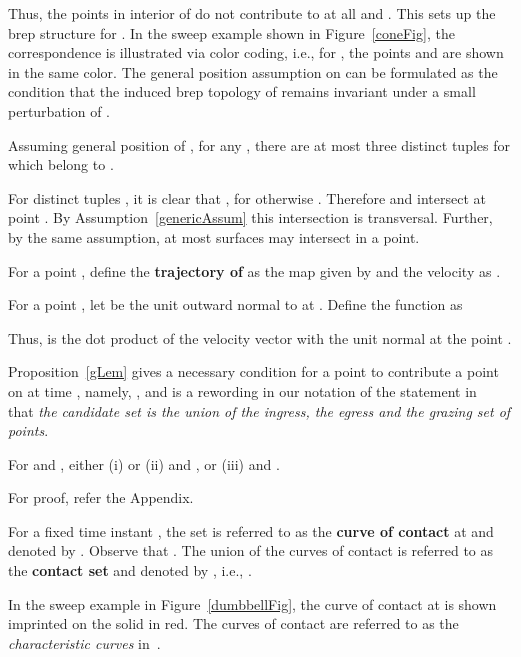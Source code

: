 \documentclass{elsart5p}
\begin{document}
Thus, the points in interior of  do not contribute to  at all and 
.  This sets up the brep 
structure for .
In the sweep example shown in Figure~\ref{coneFig}, 
the correspondence  is illustrated via color coding, i.e.,   
for , the points  and  are shown in the same color.
The general position assumption on  can be formulated as the condition
that the induced brep topology of  remains invariant under a small
perturbation of .

\begin{lem} \label{preImageLem}
Assuming general position of , for any , there are at 
most three distinct tuples  for   which belong to .
\end{lem}
 For distinct tuples , it is clear that , for otherwise .
Therefore  and  intersect 
at point .  By Assumption~\ref{genericAssum} 
this intersection is transversal.  Further, by the same assumption, at most  surfaces may intersect in a 
point. \hfill 

\begin{defn} \label{trajXDef}
For a point , define the {\bf trajectory of}  as the map  
given by  and the velocity  as 
.
\end{defn}

For a point , let  be the unit outward normal to  at .  Define the function 
 as 
 
Thus,  is the dot product of the velocity vector with the unit normal at the point .


Proposition~\ref{gLem} gives a necessary condition for a point  to 
contribute a point on  at time , namely, , 
and is a rewording in our notation of the statement in~\cite{sede} that 
{\em the candidate set is the union of the ingress, the egress and the 
grazing set of points}.

\begin{prop} \label{gLem}
For  and , either 
(i)  or 
(ii)  and , or 
(iii)  and .
\end{prop}
For proof, refer the Appendix.
\begin{defn} \label{cocDef}
For a fixed time instant , the set  is
referred to as the {\bf curve of contact} at  and denoted by . 
Observe that . The union of the 
curves of contact is referred to as the {\bf contact set} and denoted by , i.e., 
.
\end{defn}

In the sweep example in Figure~\ref{dumbbellFig}, the curve of contact at  is shown imprinted 
on the solid in red. The curves of contact are referred to as the 
{\em characteristic curves} in~\cite{peternell}.
\end{document}
